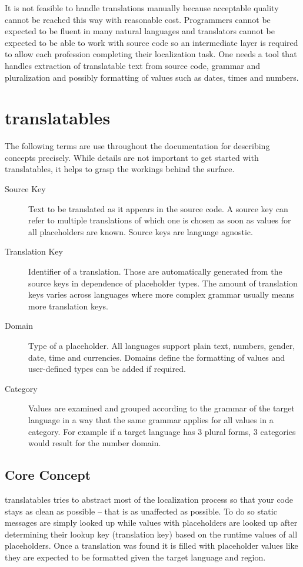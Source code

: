 \documentclass[a4paper,11pt,twoside]{report}
\begin{document}
It is not feasible to handle translations manually because acceptable quality cannot be reached this way with reasonable cost. Programmers cannot be expected to be fluent in many natural languages and translators cannot be expected to be able to work with source code so an intermediate layer is required to allow each profession completing their localization task. One needs a tool that handles extraction of translatable text from source code, grammar and pluralization and possibly formatting of values such as dates, times and numbers.

\chapter{translatables}
The following terms are use throughout the documentation for describing concepts precisely. While details are not important to get started with translatables, it helps to grasp the workings behind the surface.
\begin{description}
	\item[Source Key] Text to be translated as it appears in the source code. A source key can refer to multiple translations of which one is chosen as soon as values for all placeholders are known. Source keys are language agnostic.
	\item[Translation Key] Identifier of a translation. Those are automatically generated from the source keys in dependence of placeholder types. The amount of translation keys varies across languages where more complex grammar usually means more translation keys.
	\item[Domain] Type of a placeholder. All languages support plain text, numbers, gender, date, time and currencies. Domains define the formatting of values and user-defined types can be added if required.
	\item[Category] Values are examined and grouped according to the grammar of the target language in a way that the same grammar applies for all values in a category. For example if a target language has 3 plural forms, 3 categories would result for the number domain.
\end{description}
\section{Core Concept}
translatables tries to abstract most of the localization process so that your code stays as clean as possible – that is as unaffected as possible. To do so static messages are simply looked up while values with placeholders are looked up after determining their lookup key (translation key) based on the runtime values of all placeholders. Once a translation was found it is filled with placeholder values like they are expected to be formatted given the target language and region.
\end{document}
